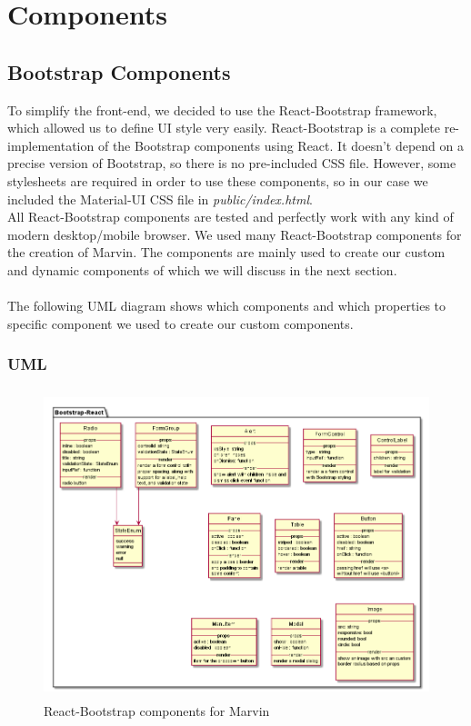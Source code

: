 \documentclass[../react]{subfiles}
\begin{document}
	
	\section{Components}

	\subsection{Bootstrap Components} To simplify the front-end, we decided to use the React-Bootstrap framework, which allowed us to define UI style very easily. React-Bootstrap is a complete re-implementation of the Bootstrap components using React. It doesn't depend on a precise version of Bootstrap, so there is no pre-included CSS file. However, some stylesheets are required in order to use these components, so in our case we included the Material-UI CSS file in \textit{public/index.html}. \\ All React-Bootstrap components are tested and perfectly work with any kind of modern desktop/mobile browser. We used many React-Bootstrap components for the creation of Marvin. The components are mainly used to create our custom and dynamic components 
	of which we will discuss in the next section. \\ \\ The following UML diagram shows which components and which properties to specific component we used to create our custom components. 
		\subsubsection{UML}
		\begin{figure}[h]
			\centering
			\includegraphics[width=14cm,height=9cm]{"diagrammi/react/bootstrap"}
			\caption{React-Bootstrap components for Marvin}
			\label{fig:React-Bootstrap components for Marvin}
		\end{figure}
	\newpage
\end{document}
